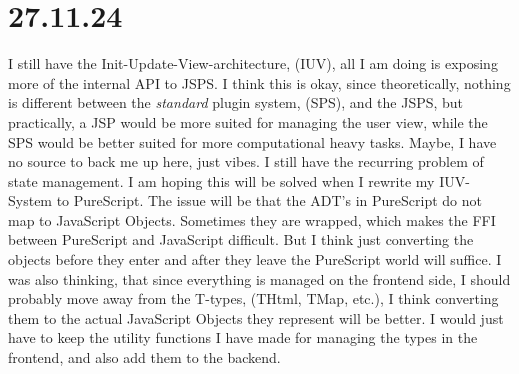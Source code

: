 \section{27.11.24}

I still have the Init-Update-View-architecture, (IUV), all I am doing is
exposing more of the internal API to JSPS. I think this is okay, since
theoretically, nothing is different between the \textit{standard} plugin system,
(SPS), and the JSPS, but practically, a JSP would be more suited for managing
the user view, while the SPS would be better suited for more computational heavy
tasks. Maybe, I have no source to back me up here, just vibes. I still have the
recurring problem of state management. I am hoping this will be solved when I
rewrite my IUV-System to PureScript. The issue will be that the ADT's in
PureScript do not map to JavaScript Objects. Sometimes they are wrapped, which
makes the FFI between PureScript and JavaScript difficult. But I think just
converting the objects before they enter and after they leave the PureScript
world will suffice. I was also thinking, that since everything is managed on
the frontend side, I should probably move away from the T-types, (THtml, TMap,
etc.), I think converting them to the actual JavaScript Objects they represent
will be better. I would just have to keep the utility functions I have made for
managing the types in the frontend, and also add them to the backend.

